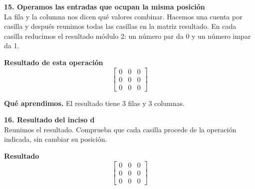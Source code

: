 \documentclass[11pt,a4paper,landscape]{article}
\begin{document}
\noindent\begin{minipage}{\linewidth}\textbf{15. Operamos las entradas que ocupan la misma posición}\\[2pt]La fila y la columna nos dicen qué valores combinar. Hacemos una cuenta por casilla y después reunimos todas las casillas en la matriz resultado. En cada casilla reducimos el resultado módulo 2: un número par da 0 y un número impar da 1.
\par{}\par\smallskip
\par\smallskip \textbf{Resultado de esta operación}\[\begin{bmatrix}0 & 0 & 0\\0 & 0 & 0\\0 & 0 & 0\end{bmatrix}\]
\par\smallskip\textbf{Qué aprendimos.} El resultado tiene 3 filas y 3 columnas.
\end{minipage}\par\medskip
\noindent\begin{minipage}{\linewidth}\textbf{16. Resultado del inciso d}\\[2pt]Reunimos el resultado. Comprueba que cada casilla procede de la operación indicada, sin cambiar su posición.
\par\smallskip \textbf{Resultado}\[\begin{bmatrix}0 & 0 & 0\\0 & 0 & 0\\0 & 0 & 0\end{bmatrix}\]
\end{minipage}\par\medskip
\end{document}
